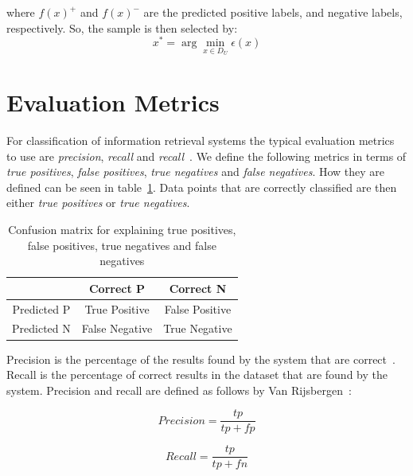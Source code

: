 where $f(x)^+$ and $f(x)^-$ are the predicted positive labels, and negative labels, respectively.
So, the sample is then selected by:
\begin{equation}
    x^* = \arg \min_{x \in D_U} \epsilon(x)
\end{equation}

\section{Evaluation Metrics}

For classification of information retrieval systems the typical evaluation metrics to use are \textit{precision}, \textit{recall} and \textit{recall}~\cite{jiang2012information}.
We define the following metrics in terms of \textit{true positives}, \textit{false positives}, \textit{true negatives} and \textit{false negatives}.
How they are defined can be seen in table~\ref{tab:conf-matr}.
Data points that are correctly classified are then either \textit{true positives} or \textit{true negatives}.

\begin{table}[!ht]
    \begin{center}
        \begin{tabular}{c c c}
            & Correct P & Correct N \\
            \toprule
            Predicted P & True Positive & False Positive \\
            Predicted N & False Negative & True Negative \\
        \end{tabular}
    \end{center}
    \caption{Confusion matrix for explaining true positives, false positives, true negatives and false negatives}\label{tab:conf-matr}
\end{table}

Precision is the percentage of the results found by the system that are correct~\cite{tjong2003introduction}.
Recall is the percentage of correct results in the dataset that are found by the system.
Precision and recall are defined as follows by Van Rijsbergen~\cite{rijsenbergen1979information}:

\begin{equation}
    Precision = \frac{tp}{tp+fp}
\end{equation}

\begin{equation}
    Recall = \frac{tp}{tp+fn}
\end{equation}

